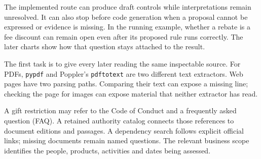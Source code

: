 The implemented route can produce draft controls while interpretations remain
unresolved. It can also stop before code generation when a proposal cannot be
expressed or evidence is missing. In the running example, whether a rebate is
a fee discount can remain open even after its proposed rule runs correctly.
The later charts show how that question stays attached to the result.

\clearpage
{}
The first task is to give every later reading the same inspectable source.
For PDFs, \texttt{pypdf} and Poppler's \texttt{pdftotext} are two different text
extractors. Web pages have two parsing paths. Comparing their text can expose
a missing line; checking the page for images can expose material that neither
extractor has read.

\begin{MapDiagram}
\end{MapDiagram}

A gift restriction may refer to the Code of Conduct and a frequently asked
question (FAQ). A retained authority catalog connects those references to
document editions and passages. A dependency search follows explicit official
links; missing documents remain named questions. The relevant business scope
identifies the people, products, activities and dates being assessed.


